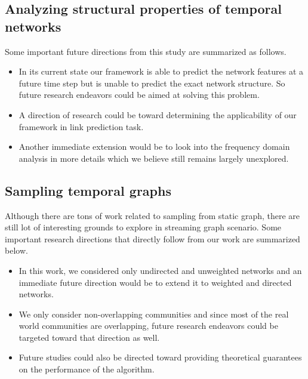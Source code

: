 \subsection{Analyzing structural properties of temporal networks} 
Some important future directions from this study are summarized as follows.
\begin{itemize}
\item In its current state our framework is able to predict the network features at a future time step but is unable to predict the exact network structure. So future research endeavors could be aimed at solving this problem.
\item A direction of research could be toward determining the applicability of our framework in link prediction task.
\item Another immediate extension would be to look into the frequency domain analysis in more details which we believe still remains largely unexplored. 
 
\end{itemize}

\subsection{Sampling temporal graphs} 
Although there are tons of work related to sampling from static graph, there are still lot of interesting grounds to explore in streaming graph scenario. Some important research directions that directly follow from our work are summarized below.  
\begin{itemize}
\item In this work, we considered only undirected and unweighted networks and an immediate future direction would be to extend it to weighted and directed networks.
\item We only consider non-overlapping communities and since most of the real world communities are overlapping, future research endeavors could be targeted toward that direction as well.
\item Future studies could also be directed toward providing theoretical guarantees on the performance of the algorithm.  
\end{itemize}

